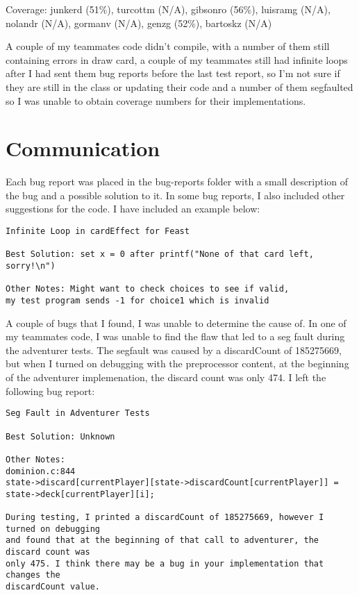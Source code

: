 \documentclass[letterpaper,12pt]{article}
\begin{document}
Coverage: junkerd (51\%), turcottm (N/A), gibsonro (56\%), luisramg (N/A), nolandr (N/A), gormanv (N/A), genzg (52\%), bartoskz (N/A)

A couple of my teammates code didn't compile, with a number of them still containing errors in draw card, a couple of my teammates still had infinite loops
after I had sent them bug reports before the last test report, so I'm not sure if they are still in the class or updating their code and a number of them segfaulted
so I was unable to obtain coverage numbers for their implementations.

\section{Communication}
Each bug report was placed in the bug-reports folder with a small description of the bug and a possible
solution to it. In some bug reports, I also included other suggestions for the code. I have included an
example below:

\begin{verbatim}
Infinite Loop in cardEffect for Feast

Best Solution: set x = 0 after printf("None of that card left, sorry!\n")

Other Notes: Might want to check choices to see if valid, 
my test program sends -1 for choice1 which is invalid
\end{verbatim}

A couple of bugs that I found, I was unable to determine the cause of. In one of my teammates code, I was unable to 
find the flaw that led to a seg fault during the adventurer tests. The segfault was caused by a discardCount of 185275669, 
but when I turned on debugging with the preprocessor content, at the beginning of the adventurer implemenation, the discard
count was only 474.  I left the following bug report:

\begin{verbatim}
Seg Fault in Adventurer Tests

Best Solution: Unknown

Other Notes:
dominion.c:844 
state->discard[currentPlayer][state->discardCount[currentPlayer]] = 
state->deck[currentPlayer][i];

During testing, I printed a discardCount of 185275669, however I turned on debugging 
and found that at the beginning of that call to adventurer, the discard count was 
only 475. I think there may be a bug in your implementation that changes the 
discardCount value.

\end{verbatim}
\end{document}
